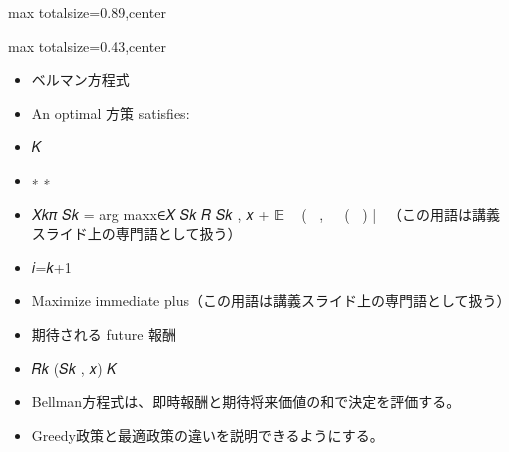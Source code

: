 \begin{minipage}[t]{0.58\textwidth}
\begin{adjustbox}{max totalsize={\textwidth}{0.89\textheight},center}
\begin{minipage}{\textwidth}
\end{minipage}
\end{adjustbox}
\end{minipage}


\clearpage
{}
\begin{minipage}[t]{0.405\textwidth}
\begin{adjustbox}{max totalsize={\textwidth}{0.43\textheight},center}
\begin{minipage}{\textwidth}\scriptsize
{}\begin{itemize}
\item ベルマン方程式
\item An optimal 方策 satisfies:
\item 𝐾
\item ∗ ∗
\item 𝑋𝑘𝜋 𝑆𝑘 = arg maxx∈𝑋 𝑆𝑘 𝑅 𝑆𝑘 , 𝑥 + 𝔼 ෍ 𝑅(𝑆𝑖 , 𝑋𝑖𝜋 (𝑆𝑖 ) |𝑆𝑘𝑥（この用語は講義スライド上の専門語として扱う）
\item 𝑖=𝑘+1
\item Maximize immediate plus（この用語は講義スライド上の専門語として扱う）
\item 期待される future 報酬
\item 𝑅𝑘 (𝑆𝑘 , 𝑥) 𝐾
\end{itemize}\begin{itemize}
\item Bellman方程式は、即時報酬と期待将来価値の和で決定を評価する。
\item Greedy政策と最適政策の違いを説明できるようにする。
\end{itemize}
\end{minipage}
\end{adjustbox}
\end{minipage}\hfill
